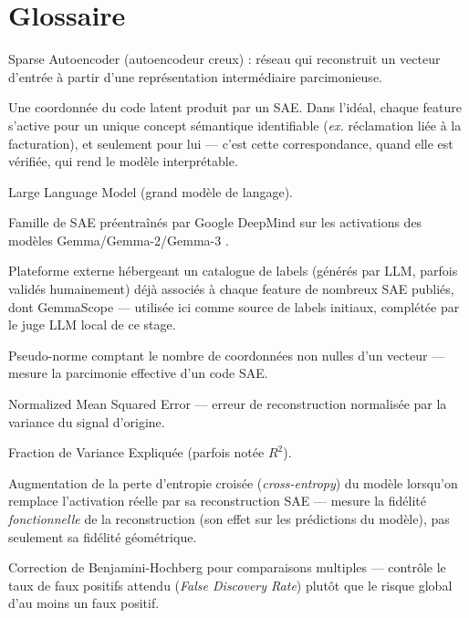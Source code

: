 \documentclass[11pt]{article}
\begin{document}
\section*{Glossaire}
\begin{description}[leftmargin=3.2cm, style=nextline]
  \item[SAE] Sparse Autoencoder (autoencodeur creux) : réseau qui reconstruit un
    vecteur d'entrée à partir d'une représentation intermédiaire parcimonieuse.
  \item[Feature] Une coordonnée du code latent produit par un SAE. Dans
    l'idéal, chaque feature s'active pour un unique concept sémantique
    identifiable (\emph{ex.} \og{}réclamation liée à la facturation\fg{}), et
    seulement pour lui --- c'est cette correspondance, quand elle est
    vérifiée, qui rend le modèle interprétable.
  \item[LLM] Large Language Model (grand modèle de langage).
  \item[GemmaScope] Famille de SAE préentraînés par Google DeepMind sur les
    activations des modèles Gemma/Gemma-2/Gemma-3 \cite{lieberum2024gemmascope}.
  \item[Neuronpedia] Plateforme externe hébergeant un catalogue de labels
    (générés par LLM, parfois validés humainement) déjà associés à chaque
    feature de nombreux SAE publiés, dont GemmaScope --- utilisée ici comme
    source de labels initiaux, complétée par le juge LLM local de ce stage.
  \item[L0] Pseudo-norme comptant le nombre de coordonnées non nulles d'un
    vecteur --- mesure la parcimonie effective d'un code SAE.
  \item[NMSE] Normalized Mean Squared Error --- erreur de reconstruction
    normalisée par la variance du signal d'origine.
  \item[FVE] Fraction de Variance Expliquée (parfois notée $R^2$).
  \item[$\Delta$CE] Augmentation de la perte d'entropie croisée (\emph{cross-entropy})
    du modèle lorsqu'on remplace l'activation réelle par sa reconstruction SAE
    --- mesure la fidélité \emph{fonctionnelle} de la reconstruction (son effet
    sur les prédictions du modèle), pas seulement sa fidélité géométrique.
  \item[BH / FDR] Correction de Benjamini-Hochberg pour comparaisons
    multiples --- contrôle le taux de faux positifs attendu (\emph{False
    Discovery Rate}) plutôt que le risque global d'au moins un faux positif.

\end{description}
\end{document}

